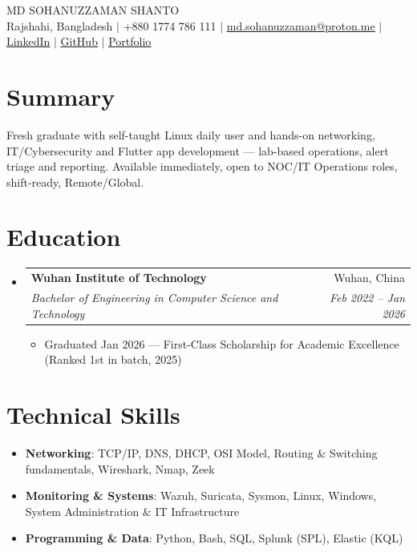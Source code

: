 \documentclass[letterpaper,11pt]{article}
\makeatletter
\newcommand{\resumeItem}[1]{
  \item\small{#1}
}
\newcommand{\resumeSubheading}[4]{
  \vspace{-2pt}\item
    \begin{tabular*}{0.97\textwidth}[t]{l@{\extracolsep{\fill}}r}
      \textbf{#1} & #2 \\
      \textit{\small#3} & \textit{\small #4} \\
    \end{tabular*}\vspace{-7pt}
}
\newcommand{\resumeSubHeadingListStart}{\begin{itemize}[leftmargin=0.15in, label={}]}
\newcommand{\resumeSubHeadingListEnd}{\end{itemize}}
\newcommand{\resumeItemListStart}{\begin{itemize}}
\newcommand{\resumeItemListEnd}{\end{itemize}\vspace{-5pt}}
\makeatother
\begin{document}
\begin{center}
    {\Huge \textsc{MD SOHANUZZAMAN SHANTO}} \\
    \vspace{6pt}
    {\small Rajshahi, Bangladesh $|$ +880 1774 786 111 $|$ \href{mailto:md.sohanuzzaman@proton.me}{\underline{md.sohanuzzaman@proton.me}} $|$ \href{https://linkedin.com/in/sohanuzzaman3301}{\underline{LinkedIn}} $|$ \href{https://github.com/sohanuzzaman3301}{\underline{GitHub}} $|$ \href{https://sohanuzzaman3301.github.io}{\underline{Portfolio}}}
\end{center}

\section{Summary}
\begin{itemize}[leftmargin=0.15in, label={}]
  \small{\item{Fresh graduate with self-taught Linux daily user and hands-on networking, IT/Cybersecurity and Flutter app development — lab-based operations, alert triage and reporting. Available immediately, open to NOC/IT Operations roles, shift-ready, Remote/Global.}}
\end{itemize}

\section{Education}
\resumeSubHeadingListStart%
\resumeSubheading%
{Wuhan Institute of Technology}{Wuhan, China}
{Bachelor of Engineering in Computer Science and Technology}{Feb 2022 -- Jan 2026}
\resumeItemListStart%
\resumeItem{Graduated Jan 2026 — First-Class Scholarship for Academic Excellence (Ranked 1st in batch, 2025)}
\resumeItemListEnd%
\resumeSubHeadingListEnd%

\section{Technical Skills}
\begin{itemize}[leftmargin=0.15in, label={}]
\small
\item{\textbf{Networking}: TCP/IP, DNS, DHCP, OSI Model, Routing \& Switching fundamentals, Wireshark, Nmap, Zeek}
\item{\textbf{Monitoring \& Systems}: Wazuh, Suricata, Sysmon, Linux, Windows, System Administration \& IT Infrastructure}
\item{\textbf{Programming \& Data}: Python, Bash, SQL, Splunk (SPL), Elastic (KQL)}
\end{itemize}
\end{document}
